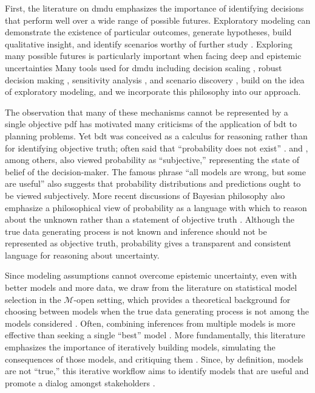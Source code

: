 \documentclass[12pt]{article}
\begin{document}
First, the literature on \gls{dmdu} emphasizes the importance of identifying decisions that perform well over a wide range of possible futures.
Exploratory modeling can demonstrate the existence of particular outcomes, generate hypotheses, build qualitative insight, and identify scenarios worthy of further study \citep[see][]{bankes:1993}.
Exploring many possible futures is particularly important when facing deep and epistemic uncertainties \citep{lempert_shaping:2003,wong_nola:2017,oddo_coastal:2017}
Many tools used for \gls{dmdu} including decision scaling \citep{Brown:2012kb}, robust decision making \citep{lempert:2007,kasprzyk:2013,kasprzyk_denovo:2012}, sensitivity analysis \citep{saltelli_comment:2019}, and scenario discovery \citep{kwakkel:2019,lamontagne_discovery:2018}, build on the idea of exploratory modeling, and we incorporate this philosophy into our approach.



The observation that many of these mechanisms cannot be represented by a single objective \gls{pdf} has motivated many criticisms of the application of \gls{bdt} to planning problems.
Yet \gls{bdt} was conceived as a calculus for reasoning rather than for identifying objective truth; \citeauthor{definetti_probability:1972} often said that ``probability does not exist'' \citeyear{definetti_probability:1972}.
\citet{savage:1954} and \citet{ramsey_probability:2016}, among others, also viewed probability as ``subjective,'' representing the state of belief of the decision-maker.
The famous phrase ``all models are wrong, but some are useful'' \citep[generally attributed to][]{box:1976} also suggests that probability distributions and predictions ought to be viewed subjectively.
More recent discussions of Bayesian philosophy \citep{jaynes_probability:2003,McElreath:2016vu,Gelman:2014tc,bernardo_bayesian:1994} also emphasize a philosophical view of probability as a language with which to reason about the unknown rather than a statement of objective truth \citep[see][for a thorough discussion of Bayesian philosophy]{gelman_philosophy:2013}.
Although the true data generating process is not known and inference should not be represented as objective truth, probability gives a transparent and consistent language for reasoning about uncertainty.

Since modeling assumptions cannot overcome epistemic uncertainty, even with better models and more data, we draw from the literature on statistical model selection in the $\mathcal{M}$-open setting, which provides a theoretical background for choosing between models when the true data generating process is not among the models considered \citep[see][]{Piironen:2017eh}.
Often, combining inferences from multiple models is more effective than seeking a single ``best'' model \citep{Yao:2018bu}.
More fundamentally, this literature emphasizes the importance of iteratively building models, simulating the consequences of those models, and critiquing them \citep{gelman_workflow:2020}.
Since, by definition, models are not ``true,'' this iterative workflow aims to identify models that are useful and promote a dialog amongst stakeholders \citep{gelman_philosophy:2013}.
\end{document}
